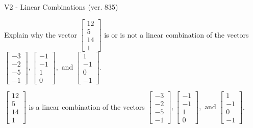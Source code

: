 \begin{exercise}
  \begin{exerciseTitle}V2 - Linear Combinations (ver. 835)\end{exerciseTitle}
  \begin{exerciseStatement}
    Explain why the vector \(\left[\begin{array}{c}
12 \\
5 \\
14 \\
1
\end{array}\right]\)  is or is not a linear 
	combination of the vectors \(\left[\begin{array}{c}
-3 \\
-2 \\
-5 \\
-1
\end{array}\right] , \left[\begin{array}{c}
-1 \\
-1 \\
1 \\
0
\end{array}\right] , \text{ and } \left[\begin{array}{c}
1 \\
-1 \\
0 \\
-1
\end{array}\right]\).
	


  \end{exerciseStatement}
  \begin{exerciseAnswer}
   \(\left[\begin{array}{c}
12 \\
5 \\
14 \\
1
\end{array}\right]\) 
  	 is  
	a linear combination of the vectors \(\left[\begin{array}{c}
-3 \\
-2 \\
-5 \\
-1
\end{array}\right] , \left[\begin{array}{c}
-1 \\
-1 \\
1 \\
0
\end{array}\right] , \text{ and } \left[\begin{array}{c}
1 \\
-1 \\
0 \\
-1
\end{array}\right]\).

	
  


  \end{exerciseAnswer}
\end{exercise}